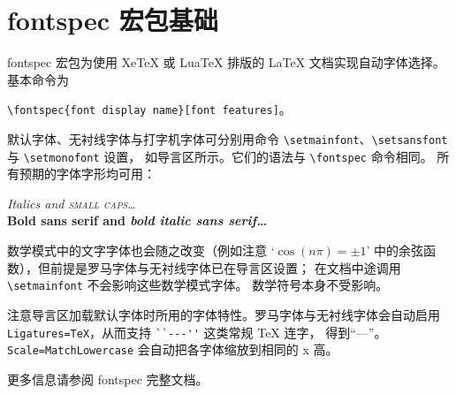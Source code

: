 \documentclass{article}
\begin{document}
\pagestyle{empty}

\section*{\textsf{fontspec} 宏包基础}

\textsf{fontspec} 宏包为使用 Xe\TeX{} 或 Lua\TeX{} 排版的
\LaTeX{} 文档实现自动字体选择。基本命令为

{\centering \verb|\fontspec{font display name}[font features]|。\par}

默认字体、无衬线字体与打字机字体可分别用命令
\verb|\setmainfont|、\verb|\setsansfont| 与 \verb|\setmonofont| 设置，
如导言区所示。它们的语法与 \verb|\fontspec| 命令相同。
所有预期的字体字形均可用：

\begin{center}
  {\itshape Italics and \scshape small caps\dots}\\
  {\sffamily\bfseries Bold sans serif and \itshape bold italic sans serif\dots}
\end{center}

数学模式中的文字字体也会随之改变（例如注意 `$\cos(n\pi)=\pm 1$'
中的余弦函数），但前提是罗马字体与无衬线字体已在导言区设置；
在文档中途调用 \verb|\setmainfont| 不会影响这些数学模式字体。
数学符号本身不受影响。

注意导言区加载默认字体时所用的字体特性。罗马字体与无衬线字体会自动启用
\verb|Ligatures=TeX|，从而支持 \verb|``---''| 这类常规 \TeX{} 连字，
得到“---”。\verb|Scale=MatchLowercase| 会自动把各字体缩放到相同的 x 高。

更多信息请参阅 \textsf{fontspec} 完整文档。
\end{document}
